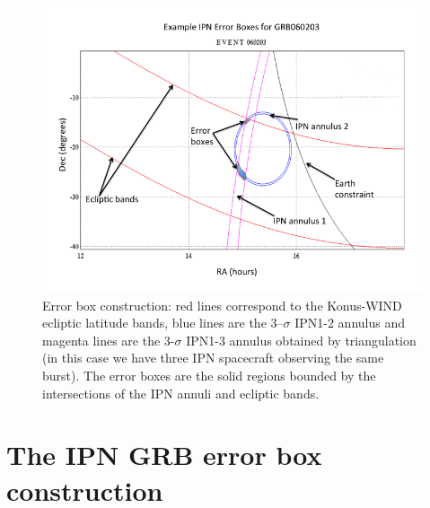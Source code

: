 \begin{figure}[htb]
\begin{center}
\includegraphics[width=32pc]{Images/Slide1.png}
\caption{\label{fig:error_box}Error box construction: red lines correspond to the Konus-WIND ecliptic latitude bands, blue lines are the 3--$\sigma$ IPN1-2 annulus and magenta lines are the 3-$\sigma$ IPN1-3 annulus obtained by triangulation (in this case we have three IPN spacecraft observing the same burst). The error boxes are the solid regions bounded by the intersections of the IPN annuli and ecliptic bands. }
\end{center}
\label{errorbox}
\end{figure}

\section{The IPN GRB error box construction}

